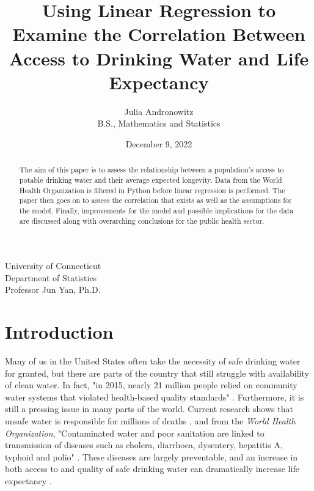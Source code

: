 \documentclass[12pt]{article}
\title{Using Linear Regression to Examine the Correlation Between Access to Drinking Water and Life Expectancy}
\author{Julia Andronowitz\\B.S., Mathematics and Statistics}
\date{December 9, 2022}
\begin{document}
\maketitle
\thispagestyle{empty}

\begin{abstract}

The aim of this paper is to assess the relationship between a population's access to potable drinking water and their average expected longevity. Data from the World Health Organization is filtered in Python before linear regression is performed. The paper then goes on to assess the correlation that exists as well as the assumptions for the model. Finally, improvements for the model and possible implications for the data are discussed along with overarching conclusions for the public health sector.

\end{abstract}

\vfill

\begin{center}
    University of Connecticut \\ Department of Statistics \\ Professor Jun Yan, Ph.D.
\end{center}

\section{Introduction}

Many of us in the United States often take the necessity of safe drinking water for granted, but there are parts of the country that still struggle with availability of clean water. In fact, "in 2015, nearly 21 million people relied on community water systems that violated health-based quality standards" \citep{2018nattrends}. Furthermore, it is still a pressing issue in many parts of the world. Current research shows that unsafe water is responsible for millions of deaths \citep{ritchieroser2019water}, and from the \textit{World Health Organization}, "Contaminated water and poor sanitation are linked to transmission of diseases such as cholera, diarrhoea, dysentery, hepatitis A, typhoid and polio" \citep{who2017water}. These diseases are largely preventable, and an increase in both access to and quality of safe drinking water can dramatically increase life expectancy \citep{angelakis2021quality}.
\end{document}
